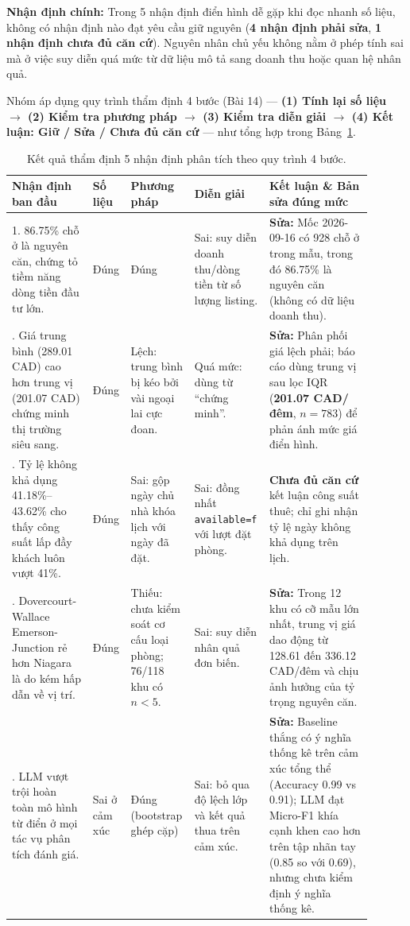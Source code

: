 \textbf{Nhận định chính:} Trong 5 nhận định điển hình dễ gặp khi đọc nhanh số liệu, không có nhận định nào đạt yêu cầu giữ nguyên (\textbf{4 nhận định phải sửa}, \textbf{1 nhận định chưa đủ căn cứ}). Nguyên nhân chủ yếu không nằm ở phép tính sai mà ở việc suy diễn quá mức từ dữ liệu mô tả sang doanh thu hoặc quan hệ nhân quả.

Nhóm áp dụng quy trình thẩm định 4 bước (Bài 14) --- \textbf{(1) Tính lại số liệu $\rightarrow$ (2) Kiểm tra phương pháp $\rightarrow$ (3) Kiểm tra diễn giải $\rightarrow$ (4) Kết luận: Giữ / Sửa / Chưa đủ căn cứ} --- như tổng hợp trong Bảng~\ref{tab:audit}.

\begin{table}[htbp]
  \centering
  \footnotesize
  \begin{tabular}{p{0.225\linewidth}p{0.065\linewidth}p{0.16\linewidth}p{0.16\linewidth}p{0.29\linewidth}}
    \toprule
    \textbf{Nhận định ban đầu} & \textbf{Số liệu} & \textbf{Phương pháp} & \textbf{Diễn giải} & \textbf{Kết luận \& Bản sửa đúng mức} \\
    \midrule
    1. 86.75\% chỗ ở là nguyên căn, chứng tỏ tiềm năng dòng tiền đầu tư lớn. & Đúng & Đúng & Sai: suy diễn doanh thu/dòng tiền từ số lượng listing. & \textbf{Sửa:} Mốc 2026-09-16 có 928 chỗ ở trong mẫu, trong đó 86.75\% là nguyên căn (không có dữ liệu doanh thu). \\
    \addlinespace
    2. Giá trung bình (289.01 CAD) cao hơn trung vị (201.07 CAD) chứng minh thị trường siêu sang. & Đúng & Lệch: trung bình bị kéo bởi vài ngoại lai cực đoan. & Quá mức: dùng từ ``chứng minh''. & \textbf{Sửa:} Phân phối giá lệch phải; báo cáo dùng trung vị sau lọc IQR (\textbf{201.07 CAD/đêm}, $n = 783$) để phản ánh mức giá điển hình. \\
    \addlinespace
    3. Tỷ lệ không khả dụng 41.18\%--43.62\% cho thấy công suất lấp đầy khách luôn vượt 41\%. & Đúng & Sai: gộp ngày chủ nhà khóa lịch với ngày đã đặt. & Sai: đồng nhất \texttt{available=f} với lượt đặt phòng. & \textbf{Chưa đủ căn cứ} kết luận công suất thuê; chỉ ghi nhận tỷ lệ ngày không khả dụng trên lịch. \\
    \addlinespace
    4. Dovercourt-Wallace Emerson-Junction rẻ hơn Niagara là do kém hấp dẫn về vị trí. & Đúng & Thiếu: chưa kiểm soát cơ cấu loại phòng; 76/118 khu có $n < 5$. & Sai: suy diễn nhân quả đơn biến. & \textbf{Sửa:} Trong 12 khu có cỡ mẫu lớn nhất, trung vị giá dao động từ 128.61 đến 336.12 CAD/đêm và chịu ảnh hưởng của tỷ trọng nguyên căn. \\
    \addlinespace
    5. LLM vượt trội hoàn toàn mô hình từ điển ở mọi tác vụ phân tích đánh giá. & Sai ở cảm xúc & Đúng (bootstrap ghép cặp) & Sai: bỏ qua độ lệch lớp và kết quả thua trên cảm xúc. & \textbf{Sửa:} Baseline thắng có ý nghĩa thống kê trên cảm xúc tổng thể (Accuracy 0.99 vs 0.91); LLM đạt Micro-F1 khía cạnh khen cao hơn trên tập nhãn tay (0.85 so với 0.69), nhưng chưa kiểm định ý nghĩa thống kê. \\
    \bottomrule
  \end{tabular}
  \caption{Kết quả thẩm định 5 nhận định phân tích theo quy trình 4 bước.}
  \label{tab:audit}
\end{table}

